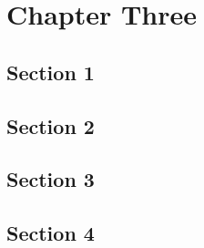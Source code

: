 \cleardoublepage %
\chapter{Chapter Three}


\section{Section 1}
\blindmathpaper
\section{Section 2}
\blindmathpaper
\section{Section 3}
\blindmathpaper
\section{Section 4}
\blindmathpaper